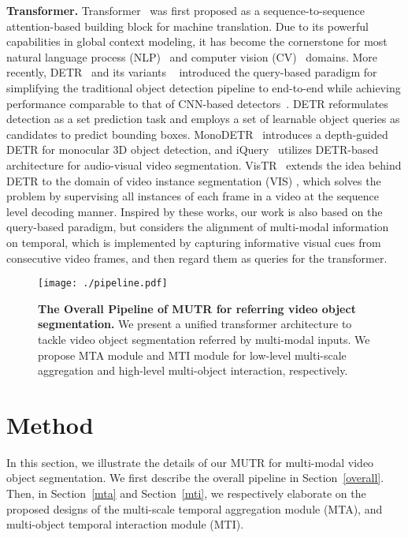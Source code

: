 \documentclass{article}
\begin{document}
\textbf{Transformer.} Transformer~\cite{vaswani2017attention} was first proposed as a sequence-to-sequence attention-based building block for machine translation. Due to its powerful capabilities in global context modeling, it has become the cornerstone for most natural language process (NLP)~\cite{ahmed2017weighted,atienza2021vision,zhang2023llama,gao2023llama} and computer vision (CV)~\cite{dosovitskiy2020image,cheng2022masked,guo2023viewrefer} domains. More recently, DETR~\cite{carion2020end} and its variants ~\cite{zhu2020deformable,zheng2020end,gao2021fast} introduced the query-based paradigm for simplifying the traditional object detection pipeline to end-to-end while achieving performance comparable to that of CNN-based detectors~\cite{girshick2015fast}. DETR reformulates detection as a set prediction task and employs a set of learnable object queries as candidates to predict bounding boxes. MonoDETR~\cite{zhangmonodetr} introduces a depth-guided DETR for monocular 3D object detection, and iQuery~\cite{chen2022iquery} utilizes DETR-based architecture for audio-visual video segmentation.
VisTR~\cite{wang2021end} extends the idea behind DETR to the domain of video instance segmentation (VIS) , which solves the problem by supervising all instances of each frame in a video at the sequence level decoding manner. Inspired by these works, our work is also based on the query-based paradigm, but considers the alignment of multi-modal information on temporal, which is implemented by capturing informative visual cues from consecutive video frames, and then regard them as queries for the transformer.
\begin{figure*}[t!]
  \centering
    \texttt{[image: ./pipeline.pdf]}
    \vspace{0.05cm}
   \caption{\textbf{The Overall Pipeline of MUTR for referring video object segmentation.} We present a unified transformer architecture to tackle video object segmentation referred by multi-modal inputs. We propose MTA module and MTI module for low-level multi-scale aggregation and high-level multi-object interaction, respectively.}
    \label{pipeline}
    \vspace{-0.2cm}
\end{figure*}


\section{Method}
In this section, we illustrate the details of our MUTR for multi-modal video object segmentation. We first describe the overall pipeline in Section~\ref{overall}. Then, in Section~\ref{mta} and Section~\ref{mti}, we respectively
elaborate on the proposed designs of the multi-scale temporal aggregation module (MTA), and multi-object temporal interaction module (MTI).
\end{document}
